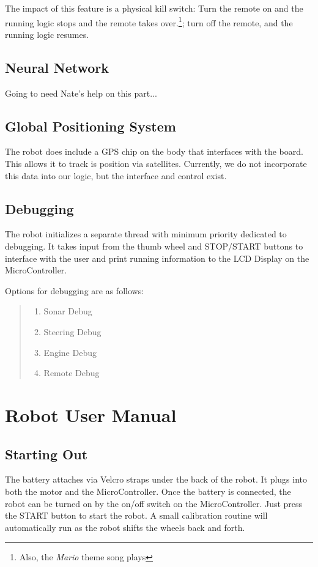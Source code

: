 \documentclass[12pt]{article}
\begin{document}
The impact of this feature is a physical kill switch: Turn the remote on and the running logic stops and the remote takes over.\footnote{Also, the \textit{Mario} theme song plays}; turn off the remote, and the running logic resumes.


\clearpage
\subsection{Neural Network}
{\color{red} Going to need Nate's help on this part...}

\clearpage
\subsection{Global Positioning System}
The robot does include a GPS chip on the body that interfaces with the board.  This allows it to track is position via satellites.  Currently, we do not incorporate this data into our logic, but the interface and control exist.

\clearpage
\subsection{Debugging}
The robot initializes a separate thread with minimum priority dedicated to debugging.  It takes input from the thumb wheel and STOP/START buttons to interface with the user and print running information to the LCD Display on the MicroController.

Options for debugging are as follows:
\begin{quote}
\begin{enumerate}
\item Sonar Debug
\item Steering Debug
\item Engine Debug
\item Remote Debug
\end{enumerate}
\end{quote}





\clearpage
\section{Robot User Manual}
\subsection{Starting Out}
The battery attaches via Velcro straps under the back of the robot.  It plugs into both the motor and the MicroController.  Once the battery is connected, the robot can be turned on by the on/off switch on the MicroController.
\vspace{2mm}
Just press the START button to start the robot.  A small calibration routine will automatically run as the robot shifts the wheels back and forth.
\end{document}
